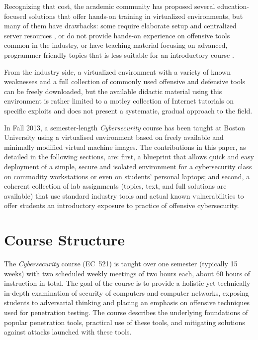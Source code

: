 \documentclass{sig-alternate-2013}
\begin{document}
Recognizing that cost, the academic community has proposed several education-focused 
solutions that offer hands-on training in virtualized environments, but many of them have drawbacks:
some require elaborate setup and centralized server resources \cite{willems2008tele}, 
or do not provide hands-on experience on offensive tools common in the industry, or 
have teaching material focusing on advanced, programmer friendly topics that is less suitable
for an introductory course \cite{seed11}. 

From the industry side, a virtualized environment with a variety of
known weaknesses \cite{metavm} and a full collection of commonly used offensive and defensive tools \cite{kali} 
can be freely downloaded, but the available didactic material using this environment is rather limited 
to a motley collection of Internet tutorials on specific exploits and does not present a systematic,
gradual approach to the field.

In Fall 2013, a semester-length \emph{Cybersecurity} course has been taught at Boston
University using a virtualised environment based on freely available and minimally modified virtual 
machine images. The contributions in this paper, as detailed in the following sections,  are: first, 
a blueprint that allows quick and easy deployment of a simple, secure and isolated environment
for a cybersecurity class on commodity workstations or even on students' personal laptops; and second,
a coherent collection of lab assignments (topics, text, and full solutions are available) that use 
standard industry tools and actual known vulnerabilities to offer students an introductory
exposure to practice of offensive cybersecurity.

\section{Course Structure}
The \emph{Cybersecurity} course (EC~521) is taught over one semester (typically 15 weeks) 
with two scheduled weekly meetings of two hours each, about 60 hours of instruction in total.
The goal of the course is to provide a holistic yet technically in-depth examination of security of 
computers and computer networks, exposing students to adversarial thinking and placing an emphasis 
on offensive techniques used for penetration testing. The course describes the underlying foundations 
of popular penetration tools, practical use of these tools, 
and mitigating solutions against attacks launched with these tools.
\end{document}
